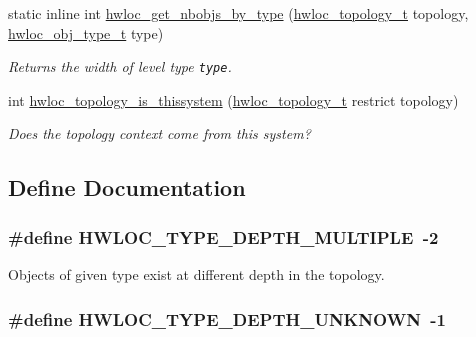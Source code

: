 \begin{CompactItemize}
static inline int \hyperlink{group__hwlocality__information_gd86a90c0d3501d90410fb1a4eb36f5d0}{hwloc\_\-get\_\-nbobjs\_\-by\_\-type} (\hyperlink{group__hwlocality__topology_g9d1e76ee15a7dee158b786c30b6a6e38}{hwloc\_\-topology\_\-t} topology, \hyperlink{group__hwlocality__types_gcd37bb612667dc437d66bfb175a8dc55}{hwloc\_\-obj\_\-type\_\-t} type)
\begin{CompactList}\small\item\em Returns the width of level type {\tt type}. \item\end{CompactList}\item 
int \hyperlink{group__hwlocality__information_g29cdfde981aafc92eb89639a36b1ff9b}{hwloc\_\-topology\_\-is\_\-thissystem} (\hyperlink{group__hwlocality__topology_g9d1e76ee15a7dee158b786c30b6a6e38}{hwloc\_\-topology\_\-t} restrict topology)
\begin{CompactList}\small\item\em Does the topology context come from this system? \item\end{CompactList}\end{CompactItemize}


\subsection{Define Documentation}
\hypertarget{group__hwlocality__information_g64c80d3e0501b321d217b1642d68e23d}{
\subsubsection[{HWLOC\_\-TYPE\_\-DEPTH\_\-MULTIPLE}]{\setlength{\rightskip}{0pt plus 5cm}\#define HWLOC\_\-TYPE\_\-DEPTH\_\-MULTIPLE~-2}}
\label{group__hwlocality__information_g64c80d3e0501b321d217b1642d68e23d}


Objects of given type exist at different depth in the topology. 

\hypertarget{group__hwlocality__information_g9e86ce528f626330de2da7adb6c4e02e}{
\subsubsection[{HWLOC\_\-TYPE\_\-DEPTH\_\-UNKNOWN}]{\setlength{\rightskip}{0pt plus 5cm}\#define HWLOC\_\-TYPE\_\-DEPTH\_\-UNKNOWN~-1}}
\label{group__hwlocality__information_g9e86ce528f626330de2da7adb6c4e02e}


